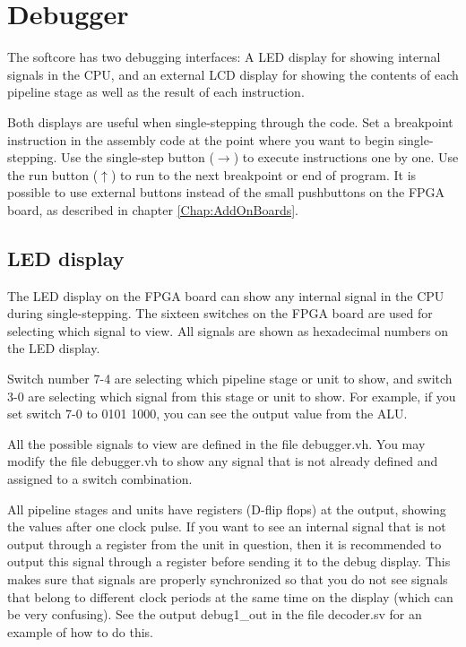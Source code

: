 \documentclass[11pt,a4paper,oneside,openright]{report}
\newcommand{\vv}{ \vspace{2mm} }   %
\begin{document}
\chapter{Debugger} \label{Chap:Debugger}
The softcore has two debugging interfaces: A LED display for showing internal signals in the CPU, and an external LCD display for showing the contents of each pipeline stage as well as the result of each instruction.
\vv

Both displays are useful when single-stepping through the code. Set a breakpoint instruction in the assembly code at the point where you want to begin single-stepping. Use the single-step button ($\rightarrow$) to execute instructions one by one. Use the run button ($\uparrow$) to run to the next breakpoint or end of program. It is possible to use external buttons instead of the small pushbuttons on the FPGA board, as described in chapter \ref{Chap:AddOnBoards}. 
\vv

\section{LED display}
The LED display on the FPGA board can show any internal signal in the CPU during single-stepping. The sixteen switches on the FPGA board are used for selecting which signal to view. All signals are shown as hexadecimal numbers on the LED display.
\vv

Switch number 7-4 are selecting which pipeline stage or unit to show, and switch 3-0 are selecting which signal from this stage or unit to show. 
For example, if you set switch 7-0 to 0101 1000, you can see the output value from the ALU.
\vv

All the possible signals to view are defined in the file debugger.vh. 
You may modify the file debugger.vh to show any signal that is not already defined and assigned to a switch combination.
\vv

All pipeline stages and units have registers (D-flip flops) at the output, showing the values after one clock pulse. If you want to see an internal signal that is not output through a register from the unit in question, then it is recommended to output this signal through a register before sending it to the debug display. This makes sure that signals are properly synchronized so that you do not see signals that belong to different clock periods at the same time on the display (which can be very confusing). See the output debug1\_out in the file decoder.sv for an example of how to do this.
\vv
\end{document}
